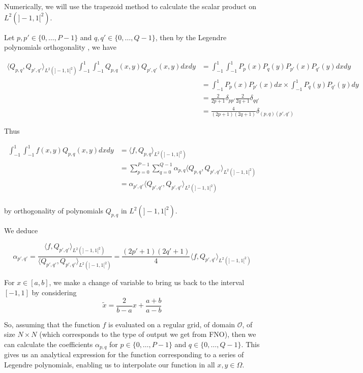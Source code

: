 \begin{Rem}
	Numerically, we will use the trapezoid method to calculate the scalar product on $L^2(]-1,1[^2)$.
\end{Rem}

Let $p,p'\in\{0,\dots,P-1\}$ and $q,q'\in\{0,\dots,Q-1\}$, then by the Legendre polynomials orthogonality , we have

\begin{align*}
	\langle Q_{p,q},Q_{p',q'}\rangle_{L^2(]-1,1[^2)}\int_{-1}^1 \int_{-1}^1 Q_{p,q}(x,y)Q_{p',q'}(x,y)dxdy&=\int_{-1}^1 \int_{-1}^1 P_p(x)P_q(y)P_{p'}(x)P_{q'}(y)dxdy \\
	&=\int_{-1}^1 P_p(x)P_{p'}(x)dx\times \int_{-1}^1 P_q(y)P_{q'}(y)dy \\
	&=\frac{2}{2p+1}\delta_{pp'}\frac{2}{2q+1}\delta_{qq'} \\
	&=\frac{4}{(2p+1)(2q+1)}\delta_{(p,q)(p',q')}
\end{align*}

Thus

\begin{align*}
	\int_{-1}^1 \int_{-1}^1 f(x,y)Q_{p,q}(x,y)dxdy &= \langle f,Q_{p,q}\rangle_{L^2(]-1,1[^2)} \\
	&=\sum_{p=0}^{P-1}\sum_{q=0}^{Q-1}\alpha_{p,q} \langle Q_{p,q},Q_{p',q'}\rangle_{L^2(]-1,1[^2)} \\
	&=\alpha_{p',q'} \langle Q_{p',q'},Q_{p',q'}\rangle_{L^2(]-1,1[^2)} \\
\end{align*}

by orthogonality of polynomials $Q_{p,q}$ in  $L^2(]-1,1[^2)$. 

We deduce

$$\alpha_{p',q'} = \frac{\langle f,Q_{p',q'}\rangle_{L^2(]-1,1[^2)}}{\langle Q_{p',q'},Q_{p',q'}\rangle_{L^2(]-1,1[^2)}}=\frac{(2p'+1)(2q'+1)}{4}\langle f,Q_{p',q'}\rangle_{L^2(]-1,1[^2)}$$

\begin{Rem}
	For $x\in[a,b]$, we make a change of variable to bring us back to the interval $[-1,1]$ by considering
	\begin{equation*}
		\tilde{x}=\frac{2}{b-a}x+\frac{a+b}{a-b}
	\end{equation*}
\end{Rem}

So, assuming that the function $f$ is evaluated on a regular grid, of domain $\mathcal{O}$, of size $N\times N$ (which corresponds to the type of output we get from FNO), then we can calculate the coefficients $\alpha_{p,q}$ for $p\in\{0,\dots,P-1\}$ and $q\in\{0,\dots,Q-1\}$. This gives us an analytical expression for the function corresponding to a series of Legendre polynomials, enabling us to interpolate our function in all $x,y\in\Omega$.

